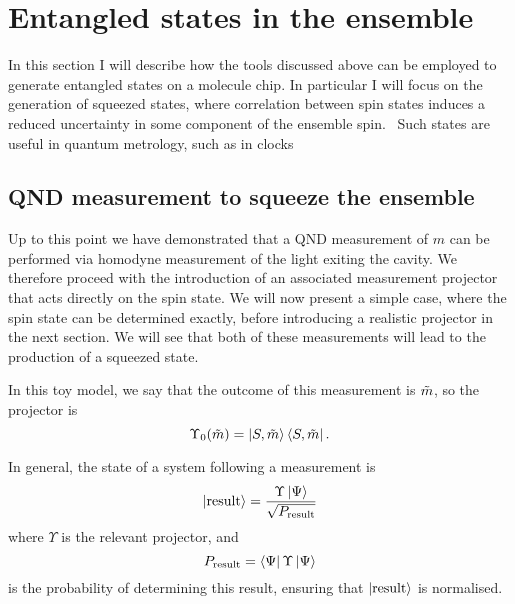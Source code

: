 \section{Entangled states in the ensemble}

In this section I will describe how the tools discussed above can be employed
to generate entangled states on a molecule chip. In particular I will focus on
the generation of squeezed states, where correlation between spin states
induces a reduced uncertainty in some component of the ensemble spin.~\cite{}
Such states are useful in quantum metrology, such as in clocks~\cite{} 


\subsection{QND measurement to squeeze the ensemble}
\label{squeeze:QNDsqueeze}

Up to this point we have demonstrated that a QND measurement of $m$ can be
performed via homodyne measurement of the light exiting the cavity. We
therefore proceed with the introduction of an associated measurement projector
that acts directly on the spin state. We will now present a simple case, where
the spin state can be determined exactly, before introducing a realistic
projector in the next section. We will see that both of these measurements will
lead to the production of a squeezed state.

In this toy model, we say that the outcome of this measurement is $\tilde{m}$,
so the projector is
%
\begin{equation}
  \Upsilon_0(\tilde{m}) = \ket{S, \tilde{m}}\bra{S, \tilde{m}}.
\end{equation}

In general, the state of a system following a measurement
is~\cite{gerry_knight_2004}
%
\begin{equation}
  \ket{\text{result}} = \frac{\Upsilon\ket{\Psi}}{\sqrt{P_\text{result}}}
  \label{squeeze:eqn:projresult}
\end{equation}
%
where $\Upsilon$ is the relevant projector, and
%
\begin{equation}
  P_\text{result} = \bra{\Psi}\Upsilon\ket{\Psi}
\end{equation}
%
is the probability of determining this result, ensuring that
$\ket{\text{result}}$ is normalised.

